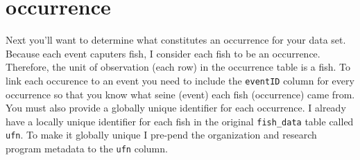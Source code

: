 \documentclass[]{book}
\newenvironment{Shaded}{\begin{snugshade}}{\end{snugshade}}
\newcommand{\CommentTok}[1]{\textcolor[rgb]{0.56,0.35,0.01}{\textit{#1}}}
\newcommand{\DataTypeTok}[1]{\textcolor[rgb]{0.13,0.29,0.53}{#1}}
\newcommand{\DecValTok}[1]{\textcolor[rgb]{0.00,0.00,0.81}{#1}}
\newcommand{\KeywordTok}[1]{\textcolor[rgb]{0.13,0.29,0.53}{\textbf{#1}}}
\newcommand{\NormalTok}[1]{#1}
\newcommand{\OperatorTok}[1]{\textcolor[rgb]{0.81,0.36,0.00}{\textbf{#1}}}
\newcommand{\StringTok}[1]{\textcolor[rgb]{0.31,0.60,0.02}{#1}}
\begin{document}
\begin{Shaded}
\end{Shaded}

\hypertarget{occurrence}{%
\section{occurrence}\label{occurrence}}

Next you'll want to determine what constitutes an occurrence for your data set. Because each event caputers fish, I consider each fish to be an occurrence. Therefore, the unit of observation (each row) in the occurrence table is a fish. To link each occurence to an event you need to include the \texttt{eventID} column for every occurrence so that you know what seine (event) each fish (occurrence) came from. You must also provide a globally unique identifier for each occurrence. I already have a locally unique identifier for each fish in the original \texttt{fish\_data} table called \texttt{ufn}. To make it globally unique I pre-pend the organization and research program metadata to the \texttt{ufn} column.
\end{document}
